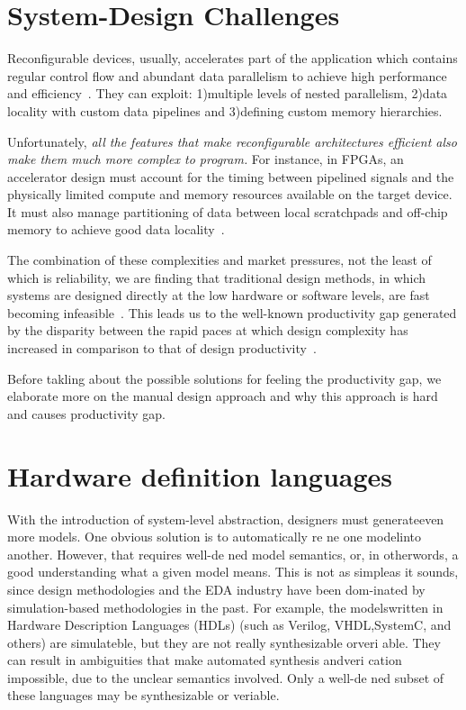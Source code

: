 \section{System-Design Challenges}


Reconfigurable devices, usually, accelerates part of the application which contains regular control flow and abundant data parallelism to achieve high performance and efficiency~\cite{spatial_computation, trips, govindaraju_hpca_2011}.
They can exploit: 1)multiple levels of nested parallelism, 2)data locality with custom data pipelines and 3)defining custom memory hierarchies.

Unfortunately, \textit{all the features that make reconfigurable architectures efficient also make them much more complex to program.}
For instance, in FPGAs, an accelerator design must account for the timing between pipelined signals and the physically limited compute and memory resources available on the target device.
It must also manage partitioning of data between local scratchpads and off-chip memory to achieve good data locality~\cite{gzip_2013_fpga}.

The combination of these complexities and market pressures, not the least
of which is reliability, we are finding that traditional design methods, in which
systems are designed directly at the low hardware or software levels, are fast
becoming infeasible~\cite{cascaval_taxonomy_accelerator}. This leads us to the well-known productivity gap generated by the disparity between the rapid paces at which design complexity has increased in comparison to that of design productivity~\cite{itrs}.


Before takling about the possible solutions for feeling the productivity gap, we elaborate more on the manual design approach and why this approach is hard and causes productivity gap.


\section{Hardware definition languages}

With the introduction of system-level abstraction, designers must generateeven more models.  One obvious solution is to automatically re ne one modelinto another. However, that requires well-de ned model semantics, or, in otherwords, a good understanding what a given model means. This is not as simpleas it sounds, since design methodologies and the EDA industry have been dom-inated by simulation-based methodologies in the past. For example, the modelswritten in Hardware Description Languages (HDLs) (such as Verilog, VHDL,SystemC, and others) are simulateble, but they are not really synthesizable orveri able.  They can result in ambiguities that make automated synthesis andveri cation impossible, due to the unclear semantics involved.   Only a well-de ned subset of these languages may be synthesizable or veriable.





